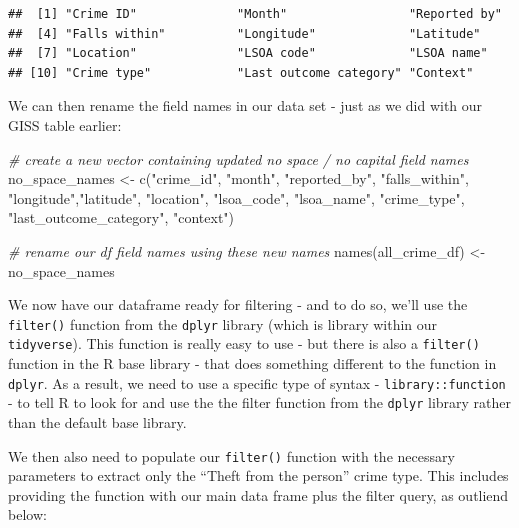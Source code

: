 \documentclass[
]{book}
\newenvironment{Shaded}{\begin{snugshade}}{\end{snugshade}}
\newcommand{\CommentTok}[1]{\textcolor[rgb]{0.56,0.35,0.01}{\textit{#1}}}
\newcommand{\FunctionTok}[1]{\textcolor[rgb]{0.00,0.00,0.00}{#1}}
\newcommand{\NormalTok}[1]{#1}
\newcommand{\OtherTok}[1]{\textcolor[rgb]{0.56,0.35,0.01}{#1}}
\newcommand{\StringTok}[1]{\textcolor[rgb]{0.31,0.60,0.02}{#1}}
\begin{document}
\begin{verbatim}
##  [1] "Crime ID"              "Month"                 "Reported by"          
##  [4] "Falls within"          "Longitude"             "Latitude"             
##  [7] "Location"              "LSOA code"             "LSOA name"            
## [10] "Crime type"            "Last outcome category" "Context"
\end{verbatim}

We can then rename the field names in our data set - just as we did with our GISS table earlier:

\begin{Shaded}
\begin{Highlighting}[]
\CommentTok{\# create a new vector containing updated no space / no capital field names}
\NormalTok{no\_space\_names }\OtherTok{\textless{}{-}} \FunctionTok{c}\NormalTok{(}\StringTok{"crime\_id"}\NormalTok{, }\StringTok{"month"}\NormalTok{, }\StringTok{"reported\_by"}\NormalTok{, }\StringTok{"falls\_within"}\NormalTok{, }\StringTok{"longitude"}\NormalTok{,}\StringTok{"latitude"}\NormalTok{, }\StringTok{"location"}\NormalTok{, }\StringTok{"lsoa\_code"}\NormalTok{, }\StringTok{"lsoa\_name"}\NormalTok{, }\StringTok{"crime\_type"}\NormalTok{, }\StringTok{"last\_outcome\_category"}\NormalTok{, }\StringTok{"context"}\NormalTok{)}

\CommentTok{\# rename our df field names using these new names}
\FunctionTok{names}\NormalTok{(all\_crime\_df) }\OtherTok{\textless{}{-}}\NormalTok{ no\_space\_names}
\end{Highlighting}
\end{Shaded}

We now have our dataframe ready for filtering - and to do so, we'll use the \texttt{filter()} function from the \texttt{dplyr} library (which is library within our \texttt{tidyverse}). This function is really easy to use - but there is also a \texttt{filter()} function in the R base library - that does something different to the function in \texttt{dplyr}. As a result, we need to use a specific type of syntax - \texttt{library::function} - to tell R to look for and use the the filter function from the \texttt{dplyr} library rather than the default base library.

We then also need to populate our \texttt{filter()} function with the necessary parameters to extract only the ``Theft from the person'' crime type. This includes providing the function with our main data frame plus the filter query, as outliend below:
\end{document}
